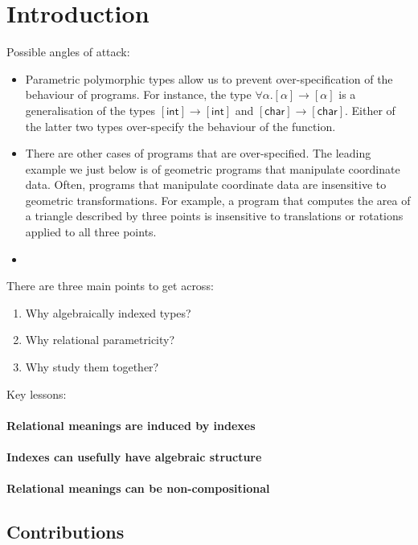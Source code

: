 \section{Introduction}
\label{sec:introduction}

Possible angles of attack:
\begin{itemize}
\item Parametric polymorphic types allow us to prevent
  over-specification of the behaviour of programs. For instance, the
  type $\forall \alpha. [\alpha] \to [\alpha]$ is a generalisation of
  the types $[\mathsf{int}] \to [\mathsf{int}]$ and $[\mathsf{char}]
  \to [\mathsf{char}]$. Either of the latter two types over-specify
  the behaviour of the function.
\item There are other cases of programs that are over-specified. The
  leading example we just below is of geometric programs that
  manipulate coordinate data. Often, programs that manipulate
  coordinate data are insensitive to geometric transformations. For
  example, a program that computes the area of a triangle described by
  three points is insensitive to translations or rotations applied to
  all three points.
\item 
\end{itemize}

There are three main points to get across:
\begin{enumerate}
\item Why algebraically indexed types?
\item Why relational parametricity?
\item Why study them together?
\end{enumerate}

Key lessons:

\paragraph{Relational meanings are induced by indexes}

\paragraph{Indexes can usefully have algebraic structure}

\paragraph{Relational meanings can be non-compositional}

\subsection{Contributions}
\label{sec:contributions}

